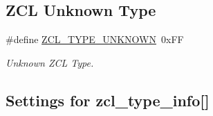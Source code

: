 \subsection*{Z\+CL Unknown Type}
\begin{DoxyCompactItemize}
\item 
\mbox{\label{group__zcl__types_ga856105c2b5037b8406a294b668dfe755}} 
\#define \hyperlink{group__zcl__types_ga856105c2b5037b8406a294b668dfe755}{Z\+C\+L\+\_\+\+T\+Y\+P\+E\+\_\+\+U\+N\+K\+N\+O\+WN}~0x\+FF
\begin{DoxyCompactList}\small\item\em Unknown Z\+CL Type. \end{DoxyCompactList}\end{DoxyCompactItemize}
\subsection*{Settings for zcl\+\_\+type\+\_\+info\mbox{[}\mbox{]}}
\label{_amgrpc5b79f6c3ee6519b88128e632fa3f35f}%
